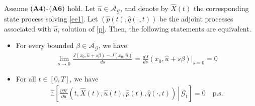 \documentclass[10pt,a4paper]{amsart}
\begin{document}
\begin{theorem}
Assume $({\bf A4)}$-$({\bf A6})$ hold. Let $\hat{u} \in \mathcal{A}_{\mathcal{G}}$, and denote by $\hat{X}(t)$  the corresponding state process solving \eqref{ee1}. Let $(\hat{p}(t), \hat{q}(\cdot,t))$ be the adjoint processes associated with $\hat{u}$, solution of \eqref{p}. Then, the following statements are equivalent.
\begin{itemize}
\item[(i)] For every bounded $\beta\in \mathcal{A}_{\mathcal{G}}$, we have
\begin{eqnarray*}
\lim_{s \to 0}\frac{J(x_{0},\hat{u}+s\beta)-J(x_{0},\hat{u})}{ds} =\frac{dJ}{ds}(x_0,\hat{u}+s\beta)|_{s=0}= 0
\end{eqnarray*}
\item[(ii)] For all $t \in [0,T]$, we have
\begin{eqnarray*}
\mathbb{E} \left[ \left. \frac{\partial \mathcal{H}}{\partial u} \left(t,\hat{X}(t), \hat{u}(t), \hat{p}(t), \hat{q}(\cdot,t) \right) \, \right| \, \mathcal{G}_t \right]= 0 \quad \text{p.s.}		
\end{eqnarray*}
\end{itemize}
\end{theorem}
\end{document}
